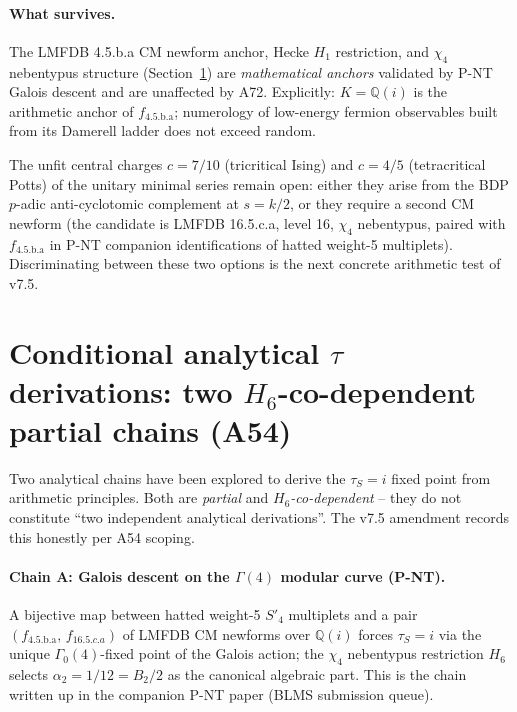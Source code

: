 \documentclass[a4paper,11pt]{article}
\newcommand{\Spf}{S'_4}
\newcommand{\fLM}{f_{\text{4.5.b.a}}}
\newcommand{\Qi}{\mathbb{Q}(i)}
\theoremstyle{definition}
\theoremstyle{remark}
\begin{document}
\paragraph{What survives.}
The LMFDB 4.5.b.a CM newform anchor, Hecke $H_1$ restriction,
and $\chi_4$ nebentypus structure (Section~\ref{sec:tau-derivations})
are \emph{mathematical anchors} validated by P-NT Galois descent
and are unaffected by A72.  Explicitly: $K=\Qi$ is the arithmetic
anchor of $\fLM$; numerology of low-energy fermion observables
built from its Damerell ladder does not exceed random.

The unfit central charges $c=7/10$ (tricritical Ising) and
$c=4/5$ (tetracritical Potts) of the unitary minimal series
remain open: either they arise from the BDP $p$-adic
anti-cyclotomic complement at $s=k/2$, or they require a second
CM newform (the candidate is LMFDB 16.5.c.a, level 16, $\chi_4$
nebentypus, paired with $\fLM$ in P-NT companion identifications
of hatted weight-5 multiplets).  Discriminating between these
two options is the next concrete arithmetic test of v7.5.

\section{Conditional analytical $\tau$ derivations: two
         $H_6$-co-dependent partial chains (A54)}
\label{sec:tau-derivations}

Two analytical chains have been explored to derive the
$\tau_S=i$ fixed point from arithmetic principles.  Both are
\emph{partial} and \emph{$H_6$-co-dependent} -- they do not
constitute ``two independent analytical derivations''.  The
v7.5 amendment records this honestly per A54 scoping.

\paragraph{Chain A: Galois descent on the $\Gamma(4)$ modular
curve (P-NT).}  A bijective map between hatted weight-5 $\Spf$
multiplets and a pair $(\fLM,\,f_{16.5.c.a})$ of LMFDB CM
newforms over $\Qi$ \cite{ECIv6053} forces $\tau_S=i$ via the
unique $\Gamma_0(4)$-fixed point of the Galois action; the
$\chi_4$ nebentypus restriction $H_6$ selects $\alpha_2=1/12=
B_2/2$ as the canonical algebraic part.  This is the chain
written up in the companion P-NT paper (BLMS submission queue).
\end{document}
